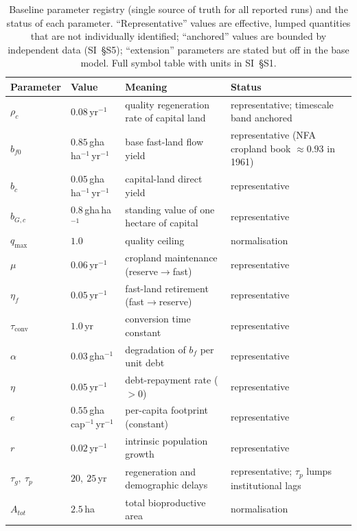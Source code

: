\documentclass[preprint,12pt,authoryear]{elsarticle}
\newcommand{\tconv}{\tau_{\mathrm{conv}}}
\begin{document}
\begin{table}[!htbp]
\centering\footnotesize
\caption{Baseline parameter registry (single source of truth for all reported runs) and the status of each parameter. ``Representative'' values are effective, lumped quantities that are not individually identified; ``anchored'' values are bounded by independent data (SI~\S S5); ``extension'' parameters are stated but off in the base model. Full symbol table with units in SI~\S S1.}
\label{tab:params}
\setlength{\tabcolsep}{4pt}
\begin{tabularx}{\textwidth}{@{}>{\raggedright\arraybackslash}p{} >{\raggedright\arraybackslash}p{} >{\raggedright\arraybackslash}X >{\raggedright\arraybackslash}p{}@{}}
\toprule
Parameter & Value & Meaning & Status \\
\midrule
$\rho_c$ & $0.08$\,yr$^{-1}$ & quality regeneration rate of capital land & representative; timescale band anchored \\
$b_{f0}$ & $0.85$\,gha\,ha$^{-1}$\,yr$^{-1}$ & base fast-land flow yield & representative (NFA cropland book $\approx0.93$ in 1961) \\
$b_c$ & $0.05$\,gha\,ha$^{-1}$\,yr$^{-1}$ & capital-land direct yield & representative \\
$b_{G,c}$ & $0.8$\,gha\,ha$^{-1}$ & standing value of one hectare of capital & representative \\
$q_{\max}$ & $1.0$ & quality ceiling & normalisation \\
$\mu$ & $0.06$\,yr$^{-1}$ & cropland maintenance (reserve$\to$fast) & representative \\
$\eta_f$ & $0.05$\,yr$^{-1}$ & fast-land retirement (fast$\to$reserve) & representative \\
$\tconv$ & $1.0$\,yr & conversion time constant & representative \\
$\alpha$ & $0.03$\,gha$^{-1}$ & degradation of $b_f$ per unit debt & representative \\
$\eta$ & $0.05$\,yr$^{-1}$ & debt-repayment rate ($>0$) & representative \\
$e$ & $0.55$\,gha\,cap$^{-1}$\,yr$^{-1}$ & per-capita footprint (constant) & representative \\
$r$ & $0.02$\,yr$^{-1}$ & intrinsic population growth & representative \\
$\tau_g,\ \tau_p$ & $20,\ 25$\,yr & regeneration and demographic delays & representative; $\tau_p$ lumps institutional lags \\
$A_{tot}$ & $2.5$\,ha & total bioproductive area & normalisation \\

\end{tabularx}
\end{table}
\end{document}

